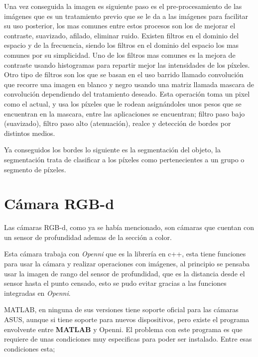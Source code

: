     Una vez conseguida la imagen es siguiente paso es el pre-procesamiento de las imágenes que es un tratamiento previo que se le da a las imágenes para facilitar su uso posterior, los mas comunes entre estos procesos son los de mejorar el contraste, suavizado, afilado, eliminar ruido. Existen filtros en el dominio del espacio y de la frecuencia, siendo los filtros en el dominio del espacio los mas comunes por su simplicidad. Uno de los filtros mas comunes es la mejora de contraste usando histogramas para repartir mejor las intensidades de los píxeles. Otro tipo de filtros son los que se basan en el uso barrido llamado convolución que recorre una imagen en blanco y negro usando una matriz llamada mascara de convolución dependiendo del tratamiento deseado. Esta operación toma un pixel como el actual, y usa los píxeles que le rodean asignándoles unos pesos que se encuentran en la mascara, entre las aplicaciones se encuentran; filtro paso bajo (suavizado), filtro paso alto (atenuación), realce y detección de bordes por distintos medios.
    
    Ya conseguidos los bordes lo siguiente es la segmentación del objeto, la segmentación trata de clasificar a los píxeles como pertenecientes a un grupo o segmento de píxeles.
    
    \section{Cámara RGB-d}
    
    Las cámaras RGB-d, como ya se había mencionado, son cámaras que cuentan con un sensor de profundidad ademas de la sección a color.
    
    
    Esta cámara trabaja con \textit{Openni} que es la librería en c++, esta tiene funciones para usar la cámara y realizar operaciones con imágenes, 
    al principio se pensaba usar la imagen de rango del sensor de profundidad, que es la distancia desde el sensor hasta el punto censado, esto se pudo evitar gracias a las funciones integradas en \textit{Openni}.
    
    MATLAB, en ninguna de sus versiones tiene soporte oficial para las cámaras ASUS, aunque si tiene soporte para nuevos dispositivos, pero existe el programa envolvente entre \textbf{MATLAB} y Openni.
    El problema con este programa es que requiere de unas condiciones muy especificas para poder ser instalado. Entre esas condiciones esta;
    
